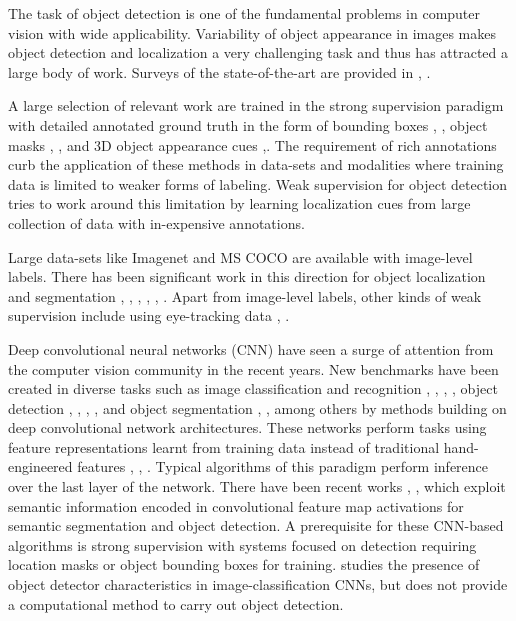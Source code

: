 \documentclass[runningheads]{llncs}
\begin{document}
The task of object detection is one of the fundamental problems in computer vision with wide applicability. Variability of object appearance in images makes object detection and localization a very challenging task and thus has attracted a large body of work. Surveys of the state-of-the-art are provided in \cite{Zhang:2013:OCD:2522968.2522978}, \cite{survey1}.

A large selection of relevant work are trained in the strong supervision paradigm with detailed  annotated ground truth in the form of  bounding boxes \cite{viola2001rapid}, \cite{felzenszwalb2010object}, object masks \cite{brox2011object}, \cite{kim2012shape}, \cite{hariharan2014simultaneous} and 3D object appearance cues \cite{glasner2011viewpoint},\cite{shrivastava2013building}. The requirement of rich annotations curb the application of these methods in data-sets and modalities where training data is limited to weaker forms of labeling. Weak supervision for object detection tries to work around this limitation by learning localization cues from large collection of data with in-expensive annotations.

Large data-sets like Imagenet \cite{deng2009imagenet} and MS COCO  are available with image-level labels. There has been significant work in this direction for object localization and segmentation \cite{galleguillos2008weakly}, \cite{chum2007exemplar}, \cite{hartmann2012weakly}, \cite{blaschko2010simultaneous}, \cite{deselaers2010localizing}, \cite{pourian2015iccv}. Apart from image-level labels, other kinds of weak supervision include using eye-tracking data \cite{papadopoulos2014training}, \cite{karthikeyaneye}. 

Deep convolutional neural networks (CNN) have seen a surge of attention from the computer vision community in the recent years. New benchmarks have been created in diverse tasks such as image classification and recognition \cite{simonyan2014very}, \cite{krizhevsky2012imagenet}, \cite{szegedy2015going}, \cite{chatfield2014return}, object detection \cite{girshick2014rich},
\cite{sermanet2013overfeat}, \cite{zhu2015segdeepm}, \cite{Zhang_2015_CVPR}, \cite{Ouyang_2015_CVPR} and object segmentation \cite{long2015fully}, \cite{chen14semantic}, \cite{noh2015learning} among others by methods building on deep convolutional network architectures. These networks perform tasks using feature representations learnt from training data instead of traditional hand-engineered features \cite{dalal2005histograms}, \cite{felzenszwalb2010object}, \cite{murphy2006object}.
Typical algorithms of this paradigm perform inference over the last layer of the network. There have been recent works \cite{hariharan2014hypercolumns}, \cite{dai2015convolutional}, \cite{he2015spatial} which exploit semantic information encoded in convolutional feature map activations for semantic segmentation and object detection. A prerequisite for these CNN-based  algorithms is strong supervision with systems focused on detection requiring location masks or object bounding boxes for training. \cite{scenecnn_iclr15} studies the presence of object detector characteristics in image-classification CNNs, but does not provide a computational method to carry out object detection.
\end{document}
